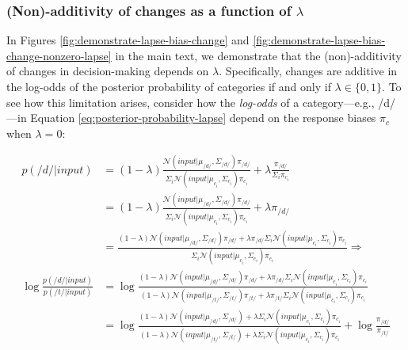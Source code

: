 \documentclass[
  11pt,
  english,
  man,floatsintext]{apa6}
\begin{document}
\hypertarget{sec:consequences-of-lambda}{%
\subsubsection{\texorpdfstring{(Non)-additivity of changes as a function of \(\lambda\)}{(Non)-additivity of changes as a function of \textbackslash lambda}}\label{sec:consequences-of-lambda}}

In Figures \ref{fig:demonstrate-lapse-bias-change} and \ref{fig:demonstrate-lapse-bias-change-nonzero-lapse} in the main text, we demonstrate that the (non)-additivity of changes in decision-making depends on \(\lambda\). Specifically, changes are additive in the log-odds of the posterior probability of categories if and only if \(\lambda \in \{0, 1\}\). To see how this limitation arises, consider how the \emph{log-odds} of a category---e.g., /d/---in Equation \eqref{eq:posterior-probability-lapse} depend on the response biases \(\pi_c\) when \(\lambda=0\):

\begin{equation}\label{eq:change-bias}
\begin{split}
p(/d/ | input) & = (1-\lambda) \frac{\mathcal{N}\!\left( input | \mu_{/d/}, \Sigma_{/d/} \right) \pi_{/d/}}{\Sigma_i \mathcal{N}\!\left( input | \mu_{c_i}, \Sigma_{c_i}\right) \pi_{c_i}} + \lambda \frac{\pi_{/d/}}{\Sigma_i \pi_{c_i}} \\
 & = (1-\lambda) \frac{\mathcal{N}\!\left( input | \mu_{/d/}, \Sigma_{/d/} \right) \pi_{/d/}}{\Sigma_i \mathcal{N}\!\left( input | \mu_{c_i}, \Sigma_{c_i}\right) \pi_{c_i}} + \lambda \pi_{/d/} \\
 & = \frac{(1-\lambda) \mathcal{N}\!\left( input | \mu_{/d/}, \Sigma_{/d/} \right) \pi_{/d/} + \lambda \pi_{/d/} \Sigma_i \mathcal{N}\!\left( input | \mu_{c_i}, \Sigma_{c_i}\right) \pi_{c_i}}{\Sigma_i \mathcal{N}\!\left( input | \mu_{c_i}, \Sigma_{c_i}\right) \pi_{c_i}} \Rightarrow \\
\log \frac{p(/d/ | input)}{p(/t/ | input)}  & = \log \frac{(1-\lambda) \mathcal{N}\!\left( input | \mu_{/d/}, \Sigma_{/d/} \right) \pi_{/d/} + \lambda \pi_{/d/} \Sigma_i \mathcal{N}\!\left( input | \mu_{c_i}, \Sigma_{c_i}\right) \pi_{c_i}}{(1-\lambda) \mathcal{N}\!\left( input | \mu_{/t/}, \Sigma_{/t/} \right) \pi_{/t/} + \lambda \pi_{/t/} \Sigma_i \mathcal{N}\!\left( input | \mu_{c_i}, \Sigma_{c_i}\right) \pi_{c_i}} \\
 & = \log \frac{(1-\lambda) \mathcal{N}\!\left( input | \mu_{/d/}, \Sigma_{/d/} \right) + \lambda \Sigma_i \mathcal{N}\!\left( input | \mu_{c_i}, \Sigma_{c_i}\right) \pi_{c_i}}{(1-\lambda) \mathcal{N}\!\left( input | \mu_{/t/}, \Sigma_{/t/} \right)  + \lambda  \Sigma_i \mathcal{N}\!\left( input | \mu_{c_i}, \Sigma_{c_i}\right) \pi_{c_i}} + \log\frac{\pi_{/d/}}{\pi_{/t/}} \\
\end{split}
\end{equation}
\end{document}
